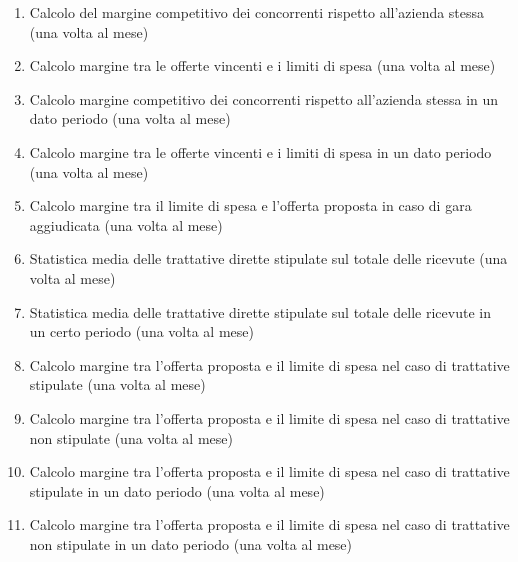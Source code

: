 \begin{enumerate}
  \item Calcolo del margine competitivo dei concorrenti rispetto all’azienda stessa (una volta al mese)
  \item Calcolo margine tra le offerte vincenti e i limiti di spesa (una volta al mese)
  \item Calcolo margine  competitivo dei concorrenti rispetto all’azienda stessa in un dato periodo (una volta al mese)
  \item Calcolo margine tra le offerte vincenti e i limiti di spesa in un dato periodo (una volta al mese)
  \item Calcolo margine tra il limite di spesa e l'offerta proposta in caso di gara aggiudicata (una volta al mese)
  \item Statistica media delle trattative dirette stipulate sul totale delle ricevute (una volta al mese)
  \item Statistica media delle trattative dirette stipulate sul totale delle ricevute in un certo periodo (una volta al mese)
  \item Calcolo margine tra l'offerta proposta e il limite di spesa nel caso di trattative stipulate (una volta al mese)
  \item Calcolo margine tra l'offerta proposta e il limite di spesa nel caso di trattative non stipulate (una volta al mese)
  \item Calcolo margine tra l'offerta proposta e il limite di spesa nel caso di trattative stipulate in un dato periodo (una volta al mese)
  \item Calcolo margine tra l'offerta proposta e il limite di spesa nel caso di trattative non stipulate in un dato periodo (una volta al mese)


\end{enumerate}
